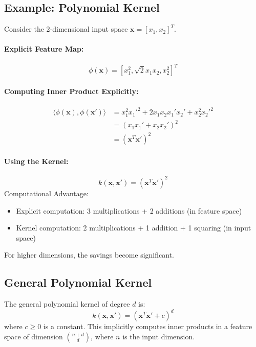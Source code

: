 \documentclass{tufte-handout}
\begin{document}
\subsection{Example: Polynomial Kernel}

Consider the 2-dimensional input space $\mathbf{x} = [x_1, x_2]^T$.

\paragraph{Explicit Feature Map:}
\begin{equation}
\phi(\mathbf{x}) = [x_1^2, \sqrt{2}x_1x_2, x_2^2]^T
\end{equation}

\paragraph{Computing Inner Product Explicitly:}
\begin{align}
\langle \phi(\mathbf{x}), \phi(\mathbf{x}') \rangle &= x_1^2{x_1'}^2 + 2x_1x_2x_1'x_2' + x_2^2{x_2'}^2 \\
&= (x_1x_1' + x_2x_2')^2 \\
&= (\mathbf{x}^T\mathbf{x}')^2
\end{align}

\paragraph{Using the Kernel:}
\begin{equation}
k(\mathbf{x}, \mathbf{x}') = (\mathbf{x}^T\mathbf{x}')^2
\end{equation}
{Computational Advantage:}
\begin{itemize}
    \item Explicit computation: 3 multiplications + 2 additions (in feature space)
    \item Kernel computation: 2 multiplications + 1 addition + 1 squaring (in input space)
\end{itemize}
For higher dimensions, the savings become significant.

\subsection{General Polynomial Kernel}

The general polynomial kernel of degree $d$ is:
\begin{equation}
k(\mathbf{x}, \mathbf{x}') = (\mathbf{x}^T\mathbf{x}' + c)^d
\end{equation}
where $c \geq 0$ is a constant. This implicitly computes inner products in a feature space of dimension $\binom{n+d}{d}$, where $n$ is the input dimension.
\end{document}
